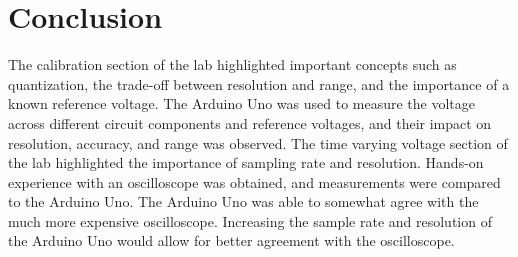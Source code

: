 \section{Conclusion}
\label{sec:conclusion}

\noindent The calibration section of the lab highlighted important concepts such as quantization, the trade-off between resolution and range, and the importance 
of a known reference voltage. The Arduino Uno was used to measure the voltage across different circuit components and reference voltages, and their 
impact on resolution, accuracy, and range was observed. The time varying voltage section of the lab highlighted the importance of sampling rate and 
resolution. Hands-on experience with an oscilloscope was obtained, and measurements were compared to the Arduino Uno. The Arduino Uno was able to
somewhat agree with the much more expensive oscilloscope. Increasing the sample rate and resolution of the Arduino Uno would allow for better agreement
with the oscilloscope.